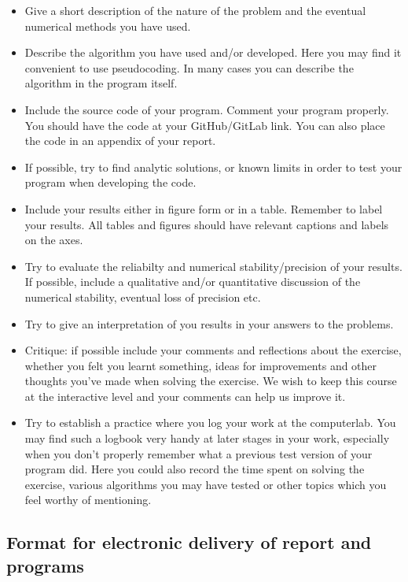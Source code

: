 \documentclass[11pt]{article}
\begin{document}
\begin{itemize}
\item
  Give a short description of the nature of the problem and the eventual
  numerical methods you have used.
\item
  Describe the algorithm you have used and/or developed. Here you may
  find it convenient to use pseudocoding. In many cases you can describe
  the algorithm in the program itself.
\item
  Include the source code of your program. Comment your program
  properly. You should have the code at your GitHub/GitLab link. You can
  also place the code in an appendix of your report.
\item
  If possible, try to find analytic solutions, or known limits in order
  to test your program when developing the code.
\item
  Include your results either in figure form or in a table. Remember to
  label your results. All tables and figures should have relevant
  captions and labels on the axes.
\item
  Try to evaluate the reliabilty and numerical stability/precision of
  your results. If possible, include a qualitative and/or quantitative
  discussion of the numerical stability, eventual loss of precision etc.
\item
  Try to give an interpretation of you results in your answers to the
  problems.
\item
  Critique: if possible include your comments and reflections about the
  exercise, whether you felt you learnt something, ideas for
  improvements and other thoughts you've made when solving the exercise.
  We wish to keep this course at the interactive level and your comments
  can help us improve it.
\item
  Try to establish a practice where you log your work at the
  computerlab. You may find such a logbook very handy at later stages in
  your work, especially when you don't properly remember what a previous
  test version of your program did. Here you could also record the time
  spent on solving the exercise, various algorithms you may have tested
  or other topics which you feel worthy of mentioning.
\end{itemize}

    \hypertarget{format-for-electronic-delivery-of-report-and-programs}{%
\subsection*{Format for electronic delivery of report and
programs}\label{format-for-electronic-delivery-of-report-and-programs}}
\end{document}
